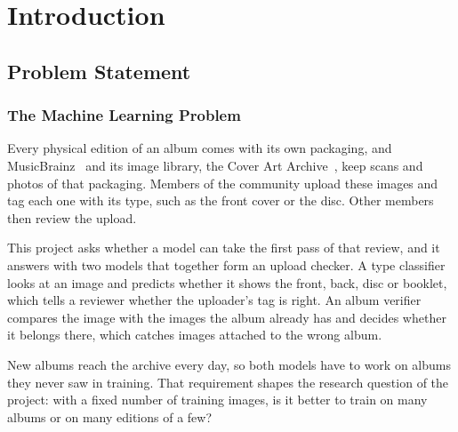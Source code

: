 \documentclass[conference]{IEEEtran}
\begin{document}
\section{Introduction}\label{sec:intro}

\subsection{Problem Statement}\label{sec:problem}

\subsubsection{The Machine Learning Problem}\label{sec:ml-problem}
Every physical edition of an album comes with its own packaging, and MusicBrainz~\cite{musicbrainz} and its image library, the Cover Art Archive~\cite{coverartarchive}, keep scans and photos of that packaging. Members of the community upload these images and tag each one with its type, such as the front cover or the disc. Other members then review the upload.

This project asks whether a model can take the first pass of that review, and it answers with two models that together form an upload checker. A type classifier looks at an image and predicts whether it shows the front, back, disc or booklet, which tells a reviewer whether the uploader's tag is right. An album verifier compares the image with the images the album already has and decides whether it belongs there, which catches images attached to the wrong album.

New albums reach the archive every day, so both models have to work on albums they never saw in training. That requirement shapes the research question of the project: with a fixed number of training images, is it better to train on many albums or on many editions of a few?
\end{document}
